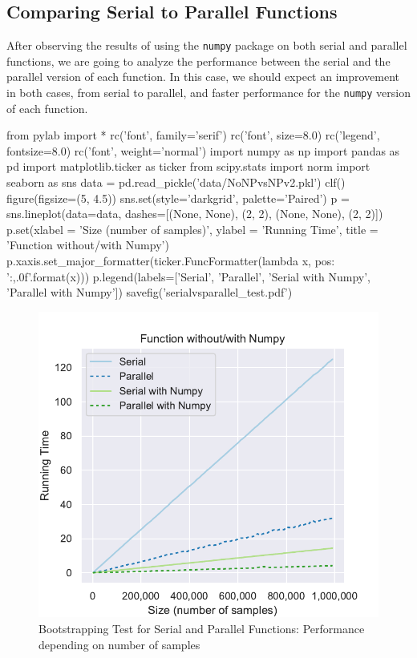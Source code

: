\documentclass[11pt]{article}
\begin{document}
\subsection{Comparing Serial to Parallel Functions}

After observing the results of using the \texttt{numpy} package on both serial and parallel functions, we are going to
analyze the performance between the serial and the parallel version of each function. In this case, we should expect an
improvement in both cases, from serial to parallel, and faster performance for the \texttt{numpy} version of each function.

\begin{pycode}
from pylab import *
rc('font', family='serif')
rc('font', size=8.0)
rc('legend', fontsize=8.0)
rc('font', weight='normal')
import numpy as np
import pandas as pd
import matplotlib.ticker as ticker
from scipy.stats import norm
import seaborn as sns
data = pd.read_pickle('data/NoNPvsNPv2.pkl')
clf()
figure(figsize=(5, 4.5))
sns.set(style='darkgrid', palette='Paired')
p = sns.lineplot(data=data, dashes=[(None, None), (2, 2), (None, None), (2, 2)])
p.set(xlabel = 'Size (number of samples)', ylabel = 'Running Time', title = 'Function without/with Numpy')
p.xaxis.set_major_formatter(ticker.FuncFormatter(lambda x, pos: '{:,.0f}'.format(x)))
p.legend(labels=['Serial', 'Parallel', 'Serial with Numpy', 'Parallel with Numpy'])
savefig('serialvsparallel_test.pdf')
\end{pycode}

\begin{figure}[H]
    \begin{center}
        \includegraphics{serialvsparallel_test.pdf}
    \end{center}
    \caption{Bootstrapping Test for Serial and Parallel Functions: Performance depending on number of samples}\label{fig:SerialVSParallelTest}
\end{figure}
\end{document}
